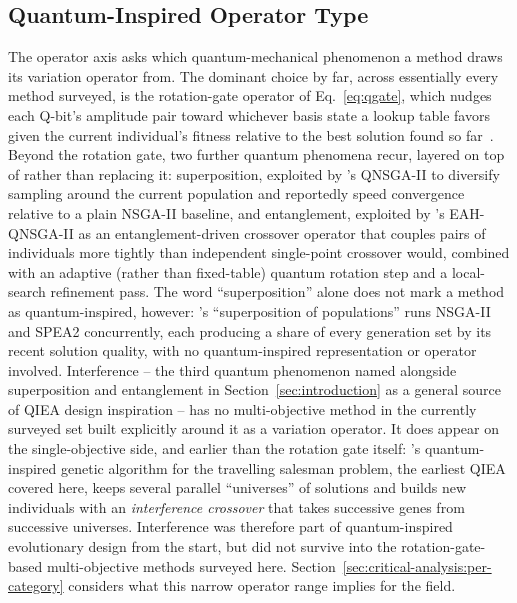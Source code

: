 \subsection{Quantum-Inspired Operator Type}
\label{sec:taxonomy:operator}

The operator axis asks which quantum-mechanical phenomenon a method
draws its variation operator from. The dominant choice by far, across
essentially every method surveyed, is the rotation-gate operator of
Eq.~\ref{eq:qgate}, which nudges each Q-bit's amplitude pair toward
whichever basis state a lookup table favors given the current
individual's fitness relative to the best solution found so
far~\citep{han2002qea,vivek2025fss}. Beyond the rotation gate, two
further quantum phenomena recur, layered on top of rather than replacing
it: superposition, exploited by \citet{guzel2022qnsga2}'s QNSGA-II to
diversify sampling around the current population and reportedly speed
convergence relative to a plain NSGA-II baseline, and entanglement,
exploited by \citet{kumar2026eahqnsga2}'s EAH-QNSGA-II as an
entanglement-driven crossover operator that couples pairs of individuals
more tightly than independent single-point crossover would, combined
with an adaptive (rather than fixed-table) quantum rotation step and a
local-search refinement pass. The word
``superposition'' alone does not mark a method as quantum-inspired,
however: \citet{florea2023superposition}'s ``superposition of
populations'' runs NSGA-II and SPEA2 concurrently, each producing a
share of every generation set by its recent solution quality, with no
quantum-inspired representation or operator involved. Interference -- the third quantum
phenomenon named alongside superposition and entanglement in
Section~\ref{sec:introduction} as a general source of QIEA design
inspiration -- has no multi-objective method in the currently surveyed
set built explicitly around it as a variation operator. It does appear
on the single-objective side, and earlier than the rotation gate itself:
\citet{narayanan1996qiga}'s quantum-inspired genetic algorithm for the
travelling salesman problem, the earliest QIEA covered here, keeps several
parallel ``universes'' of solutions and builds new individuals with an
\emph{interference crossover} that takes successive genes from successive
universes. Interference was therefore part of quantum-inspired
evolutionary design from the start, but did not survive into the
rotation-gate-based multi-objective methods surveyed here.
Section~\ref{sec:critical-analysis:per-category} considers what this
narrow operator range implies for the field.

